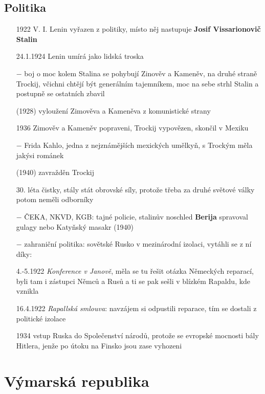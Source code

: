 \documentclass{article}
\begin{document}
\subsection*{Politika}
\begin{itemize}
    \vspace{-0.5em}
    \setlength\itemsep{0.15em}
    \item[1922] V. I. Lenin vyřazen z politiky, místo něj nastupuje \textbf{Josif Vissarionovič Stalin}
    \item[24.1.1924] Lenin umírá jako lidská troska
    \item[$-$] boj o moc kolem Stalina se pohybují Zinověv a Kameněv, na druhé straně Trockij, včichni chtějí být generálním tajemníkem, moc na sebe strhl Stalin a postupně se ostatních zbavil
    \item[(1928)] vyloužení Zimověva a Kameněva z komunistické strany
    \item[1936] Zimověv a Kameněv popraveni, Trockij vypovězen, skončil v Mexiku
    \item[$-$] Frida Kahlo, jedna z nejznámějších mexických umělkyň, s Trockým měla jakýsi románek
    \item[(1940)] zavražděn Trockij
    \item[30. léta] čistky, stály stát obrovské síly, protože třeba za druhé světové války potom neměli odborníky
    \item[$-$] ČEKA, NKVD, KGB: tajné policie, stalinův noschled \textbf{Berija} spravoval gulagy nebo Katyňský masakr (1940)
    \item[$-$] zahraniční politika: sovětské Rusko v mezinárodní izolaci, vytáhli se z ní díky:
    \item[4.-5.1922] \textit{Konference v Janově}, měla se tu řešit otázka Německých reparací, byli tam i zástupci Němců a Rusů a ti se pak sešli v blízkém Rapaldu, kde vznikla
    \item[16.4.1922] \textit{Rapallská smlouva}: navzájem si odpustili reparace, tím se dostali z politické izolace
    \item[1934] vstup Ruska do Společenství národů, protože se evropské mocnosti bály Hitlera, jenže po útoku na Finsko jsou zase vyhozeni
\end{itemize}


\section*{Výmarská republika}
\end{document}
